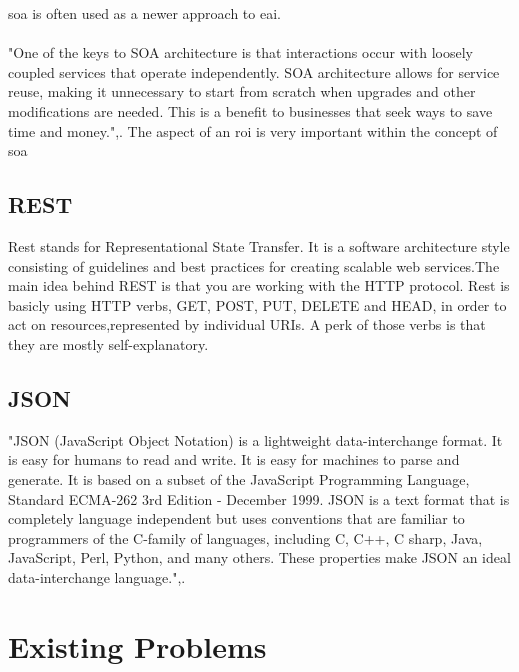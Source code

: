 \documentclass[12pt]{article}
\begin{document}
\gls{soa} is often used as a newer approach to \gls{eai}. \cite{soaitwissen}
\\ \\
"One of the keys to SOA architecture is that interactions occur with loosely coupled services that operate independently. SOA architecture allows for service reuse, making it unnecessary to start from scratch when upgrades and other modifications are needed. This is a benefit to businesses that seek ways to save time and money.",\cite{searchsoa}. The aspect of an \gls{roi} is very important within the concept of \gls{soa}
\subsection{REST}
Rest stands for Representational State Transfer. It is a software architecture style consisting of guidelines and best practices 
for creating scalable web services.The main idea behind REST is that you are working with the HTTP protocol. Rest is basicly using HTTP verbs, GET, POST, PUT, DELETE and HEAD, in order to act on resources,represented by individual URIs. 
A perk of those verbs is that they are mostly self-explanatory. 
\subsection{JSON}
"JSON (JavaScript Object Notation) is a lightweight data-interchange format. It is easy for humans to read and write. It is easy for machines to parse and generate. It is based on a subset of the JavaScript Programming Language, Standard ECMA-262 3rd Edition - December 1999. JSON is a text format that is completely language independent but uses conventions that are familiar to programmers of the C-family of languages, including C, C++, C sharp, Java, JavaScript, Perl, Python, and many others. These properties make JSON an ideal data-interchange language.",\cite{json}.

\section{Existing Problems}
\end{document}
